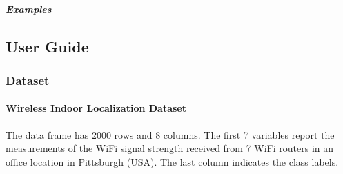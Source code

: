 \documentclass[letterpaper,10pt,english,openany,oneside]{sphinxmanual}
\begin{document}
{{{{\begin{fulllineitems}
\subparagraph{Examples}
\label{\detokenize{api_reference/generated/QuadratiK.tools.plot_clusters_2d:examples}}
\begin{sphinxVerbatim}[commandchars=\\\{\}]
   
   
  
     
\end{sphinxVerbatim}

\end{fulllineitems}




\sphinxstepscope


\subsection{User Guide}
\label{\detokenize{user_guide/index:user-guide}}\label{\detokenize{user_guide/index::doc}}

\subsubsection{Dataset}
\label{\detokenize{user_guide/index:dataset}}
\sphinxstepscope


\paragraph{Wireless Indoor Localization Dataset}
\label{\detokenize{user_guide/datasets:wireless-indoor-localization-dataset}}\label{\detokenize{user_guide/datasets:datasets}}\label{\detokenize{user_guide/datasets:id1}}\label{\detokenize{user_guide/datasets::doc}}
\sphinxAtStartPar
The  data frame has 2000 rows and 8 columns. The first 7 variables
report the measurements of the Wi\sphinxhyphen{}Fi signal strength received from 7 Wi\sphinxhyphen{}Fi routers in an
office location in Pittsburgh (USA). The last column indicates the class labels.


}}}}
\end{document}
